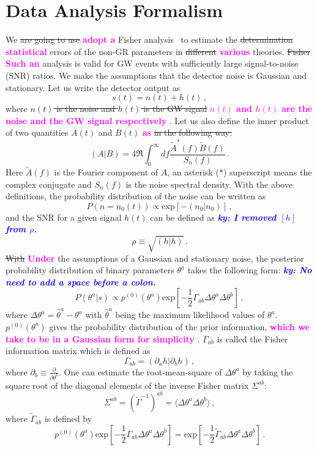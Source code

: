 \documentclass[prd,twocolumn,nofootinbib]{revtex4-1}
\newcommand\be{\begin{equation}}
\newcommand\ee{\end{equation}}
\newcommand{\ky}[1]{\textcolor{blue}{\it{\textbf{ky: #1}}} }
\newcommand{\kent}[1]{\textcolor{magenta}{\textbf{#1}} }
\begin{document}
\section{Data Analysis Formalism}
We \sout{are going to use} \kent{adopt a} Fisher analysis~\cite{Cutler:1994ys} to estimate the \sout{determination} \kent{statistical} errors of the non-GR parameters in \sout{different} \kent{various} theories. \sout{Fisher} \kent{Such an} analysis is valid for GW events with sufficiently large signal-to-noise (SNR) ratios. We make the assumptions that the detector noise is Gaussian and stationary. Let us write the detector output as
\be
s(t)=n(t)+h(t)\,,
\ee
where \sout{$n(t)$ is the noise and $h(t)$ is the GW signal} \kent{$n(t)$ and $h(t)$ are the noise and the GW signal respectively}. Let us also define the inner product of two quantities $A(t)$ and $B(t)$ \kent{as} \sout{in the following way:}
 \be
 \left(A|B\right)=4\Re\int_0^\infty df \frac{\tilde{A}^*(f)\tilde{B}(f)}{S_n \left( f \right)}\,.
 \ee
Here $\tilde{A}(f)$ is the Fourier component of $A$, an asterisk ($*$) superscript means the complex conjugate and $S_n\left(f\right)$ is the noise spectral density. With the above definitions, the probability distribution of the noise can be written as
 \be
P\left(n=n_0(t)\right) \propto \text{exp}\left[-\left(n_0|n_0\right)\right]\,,
\ee
and the SNR for a given signal $h(t)$ can be defined as \ky{I removed $[h]$ from $\rho$.}
\be
\rho \equiv\sqrt{\left(h|h\right)}\,.
\ee
\sout{With} \kent{Under} the assumptions of a Gaussian and stationary noise, the posterior probability distribution of binary parameters $\theta^a$ takes the following form: \ky{No need to add a space before a colon.}
\be
P\left(\theta^a|s\right) \propto p^{(0)}\left(\theta^a\right) \text{exp}\left[-\frac{1}{2} \Gamma_{ab} \Delta\theta^a\Delta \theta^b \right]\,,
\ee
where $\Delta \theta^a=\hat{\theta}^a-\theta^a$ with $\hat{\theta}^a$ being the maximum likelihood values of $\theta^a$. $p^{(0)}\left(\theta^a\right)$ gives the probability distribution of the prior information, \kent{which we take to be in a Gaussian form for simplicity}. $\Gamma_{ab}$ is called the Fisher information matrix which is defined as
\be
\Gamma_{ab}=\left(\partial_a h|\partial_b h \right)\,,
\ee
where $\partial_b\equiv \frac{\partial}{\partial \theta^b}$. One can estimate the root-mean-square of $\Delta \theta^a$ by taking the square root of the diagonal elements of the inverse Fisher matrix $\Sigma^{ab}$: 
\be
\Sigma^{ab}=\left(\tilde{\Gamma}^{-1}\right)^{ab}=\langle\Delta\theta^a\Delta \theta^b\rangle\,,
\ee
where $\tilde{\Gamma}_{ab}$ is defined by
\be
p^{(0)}\left(\theta^a\right) \text{exp}\left[-\frac{1}{2} \Gamma_{ab} \Delta\theta^a\Delta \theta^b \right]=\text{exp}\left[-\frac{1}{2} \tilde{\Gamma}_{ab} \Delta\theta^a\Delta \theta^b \right]\,.
\ee
\end{document}
